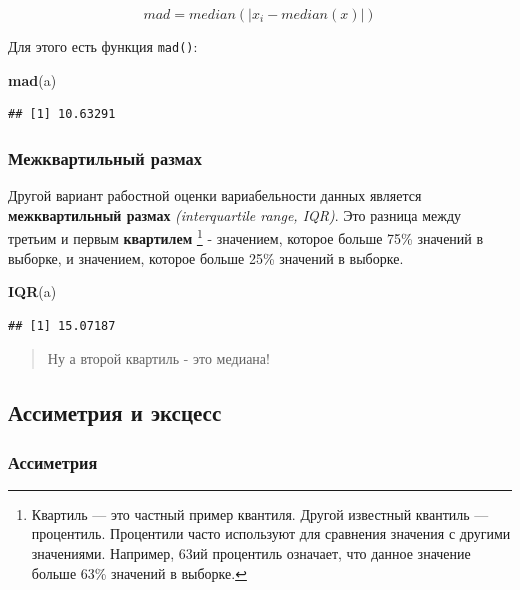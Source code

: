 \documentclass[]{book}
\newenvironment{Shaded}{\begin{snugshade}}{\end{snugshade}}
\newcommand{\KeywordTok}[1]{\textcolor[rgb]{0.13,0.29,0.53}{\textbf{#1}}}
\newcommand{\NormalTok}[1]{#1}
\begin{document}
\[mad= median(|x_{i} - median(x)|)\]

Для этого есть функция \texttt{mad()}:

\begin{Shaded}
\begin{Highlighting}[]
\KeywordTok{mad}\NormalTok{(a)}
\end{Highlighting}
\end{Shaded}

\begin{verbatim}
## [1] 10.63291
\end{verbatim}

\subsubsection{Межквартильный размах}\label{iqr}

Другой вариант рабостной оценки вариабельности данных является
\textbf{межквартильный размах} \emph{(interquartile range, IQR)}. Это
разница между третьим и первым \textbf{квартилем} \footnote{Квартиль ---
  это частный пример квантиля. Другой известный квантиль --- процентиль.
  Процентили часто используют для сравнения значения с другими
  значениями. Например, 63ий процентиль означает, что данное значение
  больше 63\% значений в выборке.} - значением, которое больше 75\%
значений в выборке, и значением, которое больше 25\% значений в выборке.

\begin{Shaded}
\begin{Highlighting}[]
\KeywordTok{IQR}\NormalTok{(a)}
\end{Highlighting}
\end{Shaded}

\begin{verbatim}
## [1] 15.07187
\end{verbatim}

\begin{quote}
Ну а второй квартиль - это медиана!
\end{quote}

\subsection{Ассиметрия и эксцесс}\label{skku}

\subsubsection{Ассиметрия}\label{skew}
\end{document}
